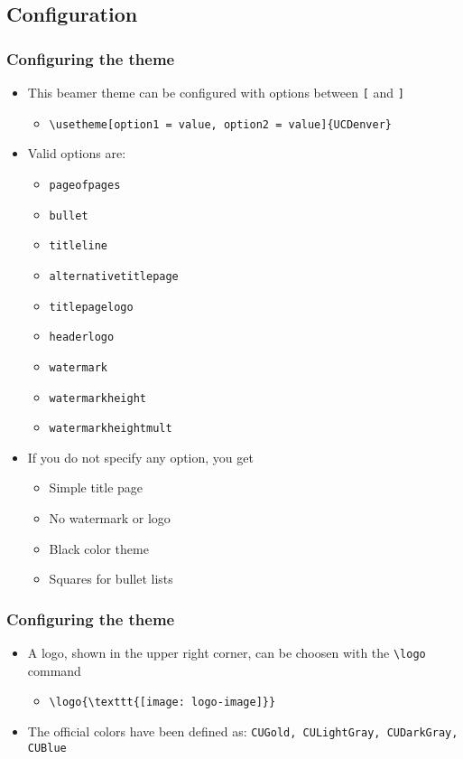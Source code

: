 \subsection{Configuration}
\begin{frame}[t,fragile]
    \frametitle{Configuring the theme}
   \begin{itemize}
      \item This beamer theme can be configured with options between \verb![! and
         \verb!]!
         \begin{itemize}
            \item \verb!\usetheme[option1 = value, option2 = value]{UCDenver}!
         \end{itemize}
      \item Valid options are: 
         \begin{itemize}
            \item \verb!pageofpages! 
            \item \verb!bullet!
            \item \verb!titleline! 
            \item \verb!alternativetitlepage!
            \item \verb!titlepagelogo!
            \item \verb!headerlogo!
            \item \verb!watermark!
            \item \verb!watermarkheight!
            \item \verb!watermarkheightmult!
         \end{itemize}
      \item If you do not specify any option, you get
         \begin{itemize}
            \item Simple title page
            \item No watermark or logo
            \item Black color theme
            \item Squares for bullet lists
         \end{itemize}
   \end{itemize}
\end{frame}
\begin{frame}[t,fragile]
    \frametitle{Configuring the theme}
   \begin{itemize}
      \item A logo, shown in the upper right corner, can be choosen with the
         \verb!\logo! command
         \begin{itemize}
            \item \verb!\logo{\texttt{[image: logo-image]}}!
         \end{itemize}
      \item The official colors have been defined as: \verb!CUGold, CULightGray, CUDarkGray, CUBlue!
   \end{itemize}
\end{frame}

